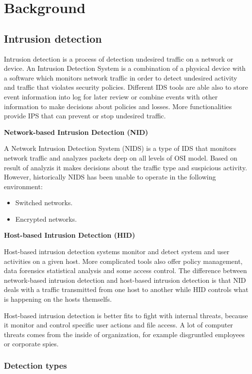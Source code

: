 \documentclass[thesis=M,english]{FITthesis}[2011/07/15]
\begin{document}
\chapter{Background}
\section{Intrusion detection}
Intrusion detection is a process of detection undesired traffic on a network or device. An Intrusion Detection System is a combination of a physical device with a software which monitors network traffic in order to detect undesired activity and traffic that violates security policies. Different IDS tools are able also to store event information into log for later review or combine events with other information to make decisions about policies and losses. More functionalities provide IPS that can prevent or stop undesired traffic.

\textbf{Network-based Intrusion Detection (NID)}

A Network Intrusion Detection System (NIDS) is a type of IDS that monitors network traffic and analyzes packets deep on all levels of OSI model. Based on result of analyzis it makes decisions about the traffic type and suspicious activity. However, historically NIDS has been unable to operate in the following environment:
\begin{itemize}
\item Switched networks.
\item Encrypted networks.
\end{itemize}

\textbf{Host-based Intrusion Detection (HID)}

Host-based intrusion detection systems monitor and detect system and user activities on a given host. More complicated tools also offer policy management, data forensics statistical analysis and some access control. The difference between network-based intrusion detection and host-based intrusion detection is that NID deals with a traffic transmitted from one host to another while HID controls what is happening on the hosts themselfs.

Host-based intrusion detection is better fits to fight with internal threats, because it monitor and control specific user actions and file access. A lot of computer threats comes from the inside of organization, for example disgruntled employees or corporate spies.

\subsection*{Detection types}
\end{document}

